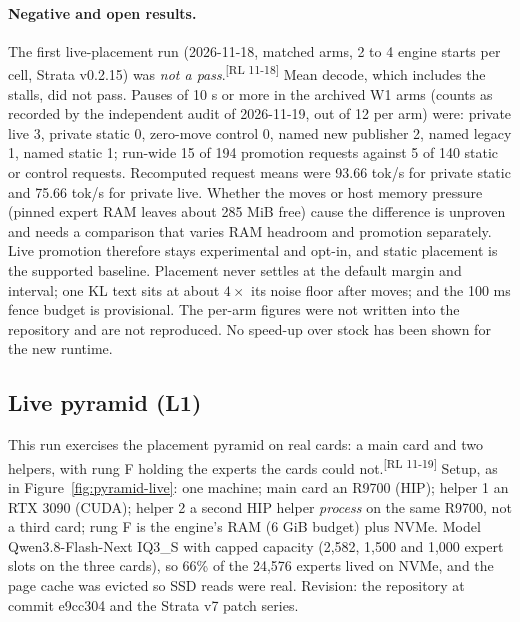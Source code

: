 \documentclass[11pt]{article}
\newcommand{\rl}[1]{\textsuperscript{\textnormal{[#1]}}} %
\begin{document}
\paragraph{Negative and open results.} The first live-placement run (2026-11-18, matched arms, 2 to 4 engine starts per
cell, Strata v0.2.15) was \emph{not a pass}.\rl{RL 11-18} Mean decode, which includes the stalls, did not pass. Pauses of 10 s or more in
the archived W1 arms (counts as recorded by the independent audit of 2026-11-19, out of 12 per arm) were: private live
3, private static 0, zero-move control 0, named new publisher 2, named legacy 1, named static 1; run-wide 15 of 194
promotion requests against 5 of 140 static or control requests. Recomputed request means were 93.66 tok/s for private
static and 75.66 tok/s for private live. Whether the moves or host memory pressure (pinned expert RAM leaves about
285 MiB free) cause the difference is unproven and needs a comparison that varies RAM headroom and promotion separately.
Live promotion therefore stays experimental and opt-in, and static placement is the supported baseline. Placement never settles at the
default margin and interval; one KL text sits at about $4\times$ its noise floor after moves; and the 100 ms fence
budget is provisional. The per-arm figures were not written into the repository and are not reproduced. No
speed-up over stock has been shown for the new runtime.

\subsection{Live pyramid (L1)}
This run exercises the placement pyramid on real cards: a main card and two helpers, with rung F
holding the experts the cards could not.\rl{RL 11-19} Setup, as in Figure~\ref{fig:pyramid-live}: one machine; main card an
R9700 (HIP); helper 1 an RTX 3090 (CUDA); helper 2 a second HIP helper \emph{process} on the same R9700, not a third card; rung F
is the engine's RAM (6 GiB budget) plus NVMe. Model Qwen3.8-Flash-Next IQ3\_S with capped capacity (2,582, 1,500 and 1,000 expert
slots on the three cards), so 66\% of the 24,576 experts lived on NVMe, and the page cache was evicted so SSD reads were real.
Revision: the repository at commit e9cc304 and the Strata v7 patch series.
\end{document}
